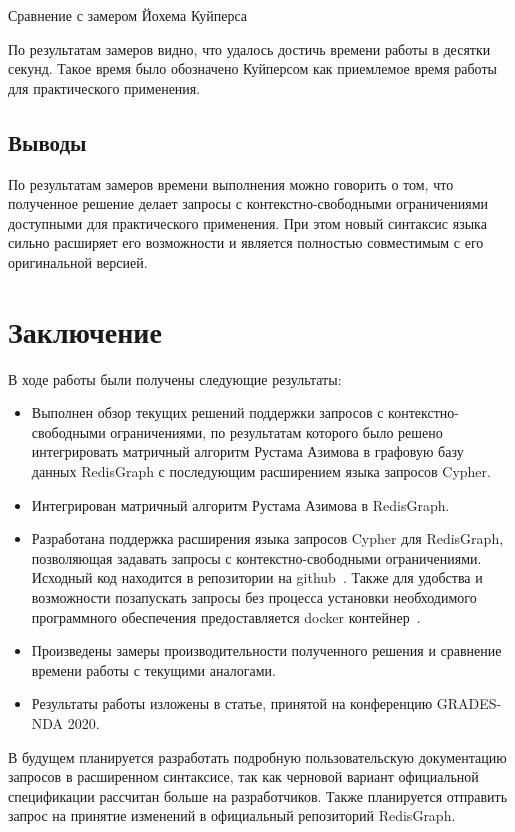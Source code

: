 \begin{table}[h!]
\begin{adjustbox}{max width=\textwidth}

\end{adjustbox}
\caption{Сравнение с замером Йохема Куйперса}
\label{tab:neo4j-vs-redisgraph}
\end{table}

По результатам замеров видно, что удалось достичь времени работы в десятки секунд. Такое время было обозначено Куйперсом как приемлемое время работы для практического применения.


\subsection{Выводы}
По результатам замеров времени выполнения можно говорить о том, что полученное решение делает запросы с контекстно-свободными ограничениями доступными для практического применения. При этом новый синтаксис языка сильно расширяет его возможности и является полностью совместимым с его оригинальной версией.

\section*{Заключение}
В ходе работы были получены следующие результаты:
\begin{itemize}
\item Выполнен обзор текущих решений поддержки запросов с кон\-текстно-свободными ограничениями, по результатам которого было решено интегрировать матричный алгоритм Рустама Азимова в графовую базу данных RedisGraph с последующим расширением языка запросов Cypher. 
\item Интегрирован матричный алгоритм Рустама Азимова в RedisGraph.
\item Разработана поддержка расширения языка запросов Cypher для RedisGraph, позволяющая задавать запросы с конте\-кстно-сво\-бод\-ными ограничениями. Исходный код находится в репозитории на github~\cite{github}. Также для удобства и возможности позапускать запросы без процесса установки необходимого программного обеспечения предоставляется docker контейнер~\cite{docker}.
\item Произведены замеры производительности полученного решения и сравнение времени работы с текущими аналогами.
\item Результаты работы изложены в статье, принятой на конференцию GRADES-NDA 2020.
\end{itemize}

В будущем планируется разработать подробную пользовательскую документацию запросов в расширенном синтаксисе, так как черновой вариант официальной спецификации рассчитан больше на разработчиков. Также планируется отправить запрос на принятие изменений в официальный репозиторий RedisGraph. 

%
%
%
